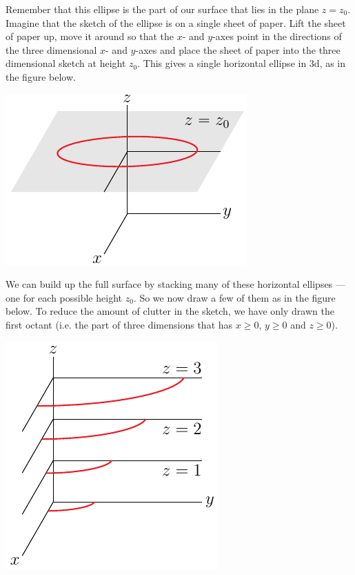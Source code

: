 \begin{eg}[$4x^2+y^2-z^2=1$]
\begin{efig}
\begin{center}
\end{center}
\end{efig}
Remember that this ellipse is the part of our surface that lies in the
plane $z=z_0$. Imagine that the sketch of the ellipse is on a single
sheet of paper. Lift the sheet of paper up, move it around so that 
the $x$- and $y$-axes point in the directions of the three dimensional 
$x$- and $y$-axes and place the sheet of paper into the three 
dimensional sketch at height $z_0$.
This gives a single horizontal ellipse in 3d, as in the figure below.
\begin{efig}
\begin{center}
   \includegraphics{hyperboloidZX.pdf}
\end{center}
\end{efig}
We can build up the full surface by stacking many of these horizontal 
ellipses --- one for each possible height $z_0$. 
So we now draw a few of them as in the figure below. To reduce the 
amount of clutter in the sketch, we have only drawn the first octant 
(i.e. the part of three dimensions that has $x\ge 0$, $y\ge 0$ and $z\ge 0$). 
\begin{efig}
\begin{center}
   \includegraphics{hyperboloidZXB.pdf}
\end{center}
\end{efig}


\end{eg}
